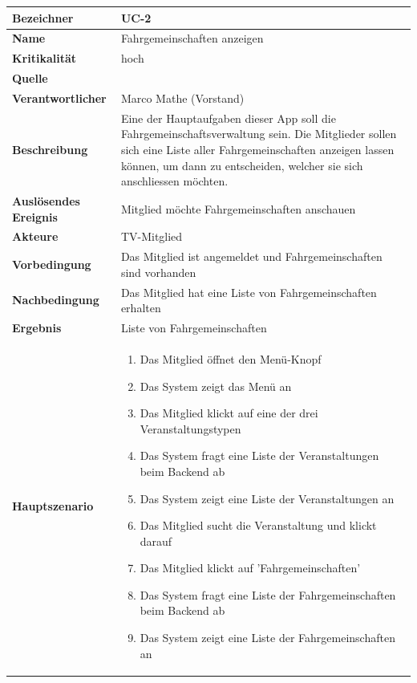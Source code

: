 \begin{table}[ht]
\centering
  \begin{tabular}{ l | p{10cm} }
	\hline
	\rowcolor{gray}
	\textbf{Bezeichner}		&	\textbf{UC-2}\\ \hline
	\textbf{Name}			&	Fahrgemeinschaften anzeigen\\ \hline
	\textbf{Kritikalität}		&	hoch\\ \hline
	\textbf{Quelle}			&	\glossarmark{Stakeholder}\\ \hline
	\textbf{Verantwortlicher}	&	Marco Mathe (Vorstand)\\ \hline
	\textbf{Beschreibung}	&	Eine der Hauptaufgaben dieser App soll die Fahrgemeinschaftsverwaltung sein. Die Mitglieder sollen sich eine Liste aller Fahrgemeinschaften anzeigen lassen können, um dann zu entscheiden, welcher sie sich anschliessen möchten.\\ \hline
	\textbf{Auslösendes Ereignis}&	Mitglied möchte Fahrgemeinschaften anschauen\\ \hline
	\textbf{Akteure}		&	TV-Mitglied\\ \hline
	\textbf{Vorbedingung}	&	Das Mitglied ist angemeldet und Fahrgemeinschaften sind vorhanden\\ \hline
	\textbf{Nachbedingung}	&	Das Mitglied hat eine Liste von Fahrgemeinschaften erhalten\\ \hline
	\textbf{Ergebnis}		&	Liste von Fahrgemeinschaften\\ \hline
	\textbf{Hauptszenario}	&	\begin{enumerate}
					\item Das Mitglied öffnet den Menü-Knopf
					\item Das System zeigt das Menü an
					\item Das Mitglied klickt auf eine der drei Veranstaltungstypen
					\item Das System fragt eine Liste der Veranstaltungen beim Backend ab
					\item Das System zeigt eine Liste der Veranstaltungen an
					\item Das Mitglied sucht die Veranstaltung und klickt darauf
					\item Das Mitglied klickt auf 'Fahrgemeinschaften'
					\item Das System fragt eine Liste der Fahrgemeinschaften beim Backend ab
					\item Das System zeigt eine Liste der Fahrgemeinschaften an
					\end{enumerate}
					\\ \hline

\end{tabular}
\end{table}
